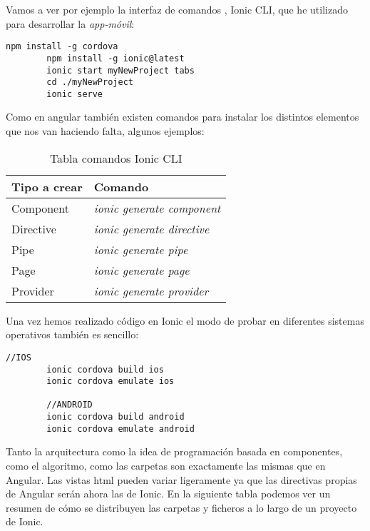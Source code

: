 Vamos a ver por ejemplo la interfaz de comandos \cite{ionicli}, Ionic CLI,  que he utilizado para desarrollar la \emph{app-móvil}: 

	\lstset{language=C, breaklines=true, basicstyle=\footnotesize}
		\begin{lstlisting}[frame=single] 
		npm install -g cordova
		npm install -g ionic@latest
		ionic start myNewProject tabs
		cd ./myNewProject
		ionic serve
    	\end{lstlisting}	 
    	
 Como en angular también existen comandos para instalar los distintos elementos que nos van haciendo falta, algunos ejemplos:
 
 \begin{table}[H]
\begin{center}
\begin{tabular}{|l|l|}
\hline
Tipo a crear & Comando  \\
\hline \hline
Component & \emph{ionic generate component}  \\ \hline
Directive & \emph{ionic generate directive}  \\ \hline
Pipe & \emph{ionic generate pipe}  \\ \hline
Page & \emph{ionic generate page}  \\ \hline
Provider & \emph{ionic generate provider}  \\ \hline
\end{tabular}
\caption{Tabla comandos Ionic CLI}
\end{center}
\end{table}   	

Una vez hemos realizado código en Ionic el modo de probar en diferentes sistemas operativos también es sencillo:

	\lstset{language=C, breaklines=true, basicstyle=\footnotesize}
		\begin{lstlisting}[frame=single] 
		//IOS
	    ionic cordova build ios
        ionic cordova emulate ios
        
      	//ANDROID
	    ionic cordova build android
        ionic cordova emulate android
    	\end{lstlisting}	 


Tanto la arquitectura como la idea de programación basada en componentes, como el algoritmo, como las carpetas son exactamente las mismas que en Angular. Las vistas html pueden variar ligeramente ya que las directivas propias de Angular serán ahora las de Ionic.  En la siguiente tabla podemos ver un resumen de cómo se distribuyen las carpetas y ficheros a lo largo de un proyecto de Ionic.

